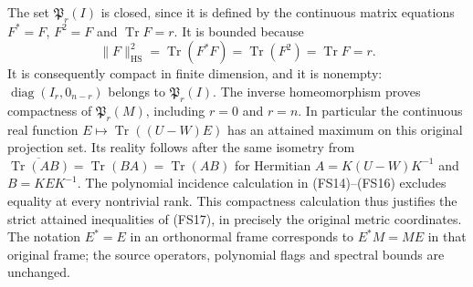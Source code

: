 The set $\mathfrak P_r(I)$ is closed, since it is defined by the
continuous matrix equations $F^*=F$, $F^2=F$ and
$\operatorname{Tr}F=r$. It is bounded because
\[
\|F\|_{\mathrm{HS}}^2
=\operatorname{Tr}(F^*F)=\operatorname{Tr}(F^2)
=\operatorname{Tr}F=r.
\]
It is consequently compact in finite dimension, and it is nonempty:
$\operatorname{diag}(I_r,0_{n-r})$ belongs to $\mathfrak P_r(I)$.
The inverse
homeomorphism proves compactness of $\mathfrak P_r(M)$, including
$r=0$ and $r=n$. In particular the continuous real function
$E\mapsto\operatorname{Tr}((U-W)E)$ has an attained maximum on
this original projection set. Its reality follows after the same
isometry from $\overline{\operatorname{Tr}(AB)}=
\operatorname{Tr}(BA)=\operatorname{Tr}(AB)$ for Hermitian
$A=K(U-W)K^{-1}$ and $B=KEK^{-1}$.
The polynomial incidence calculation in (FS14)--(FS16) excludes
equality at every nontrivial rank. This compactness calculation thus
justifies the strict attained inequalities of (FS17), in precisely
the original metric coordinates. The notation $E^*=E$ in an
orthonormal frame corresponds to $E^*M=ME$ in that original frame;
the source operators, polynomial flags and spectral bounds are unchanged.
